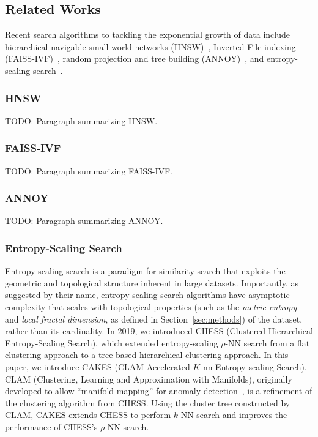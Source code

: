 \subsection{Related Works}
\label{subsec:intoduction:related-works}

Recent search algorithms to tackling the exponential growth of data include hierarchical navigable small world networks (HNSW)~\cite{Malkov2016EfficientAR}, Inverted File indexing (FAISS-IVF)~\cite{johnson2019billion}, random projection and tree building (ANNOY)~\cite{annoy}, and entropy-scaling search~\cite{yu2015entropy, ishaq2019clustered}.


\subsubsection{HNSW}
\label{subsubsec:introduction:related-works:hnsw}

TODO: Paragraph summarizing HNSW.


\subsubsection{FAISS-IVF}
\label{subsubsec:introduction:related-works:faiss-ivf}

TODO: Paragraph summarizing FAISS-IVF.


\subsubsection{ANNOY}
\label{subsubsec:introduction:related-works:annoy}

TODO: Paragraph summarizing ANNOY.


\subsubsection{Entropy-Scaling Search}
\label{subsubsec:introduction:related-works:entropy-scaling-search}

Entropy-scaling search is a paradigm for similarity search that exploits the geometric and topological structure inherent in large datasets.
Importantly, as suggested by their name, entropy-scaling search algorithms have asymptotic complexity that scales with topological properties (such as the \emph{metric entropy} and \emph{local fractal dimension}, as defined in Section~\ref{sec:methods}) of the dataset, rather than its cardinality.
In 2019, we introduced CHESS (Clustered Hierarchical Entropy-Scaling Search), which extended entropy-scaling $\rho$-NN search from a flat clustering approach to a tree-based hierarchical clustering approach.
In this paper, we introduce CAKES (CLAM-Accelerated $K$-nn Entropy-scaling Search).
CLAM (Clustering, Learning and Approximation with Manifolds), originally developed to allow ``manifold mapping'' for anomaly detection~\cite{ishaq2021clustered}, is a refinement of the clustering algorithm from CHESS.
Using the cluster tree constructed by CLAM, CAKES extends CHESS to perform $k$-NN search and improves the performance of CHESS's $\rho$-NN search.
